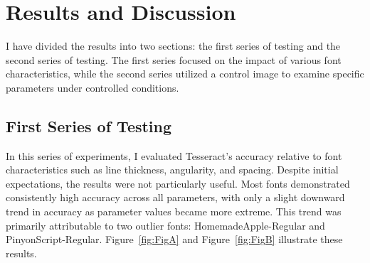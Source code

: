 \documentclass[10pt,twocolumn]{article}
\begin{document}
\section{Results and Discussion}
I have divided the results into two sections: the first series of testing and the second series of testing. The first series focused on the impact of various font characteristics, while the second series utilized a control image to examine specific parameters under controlled conditions.
\subsection{First Series of Testing}
In this series of experiments, I evaluated Tesseract's accuracy relative to font characteristics such as line thickness, angularity, and spacing. Despite initial expectations, the results were not particularly useful. Most fonts demonstrated consistently high accuracy across all parameters, with only a slight downward trend in accuracy as parameter values became more extreme. This trend was primarily attributable to two outlier fonts: HomemadeApple-Regular and PinyonScript-Regular. Figure~\ref{fig:FigA} and Figure~\ref{fig:FigB} illustrate these results.
\end{document}
